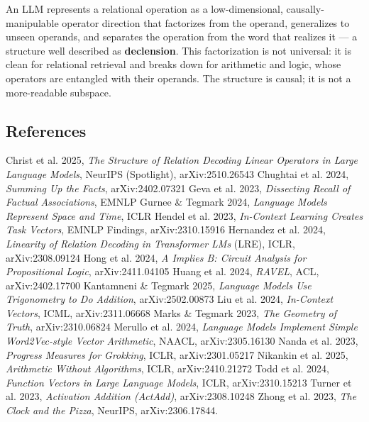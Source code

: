 An LLM represents a relational operation as a low-dimensional,
causally-manipulable operator direction that factorizes from the
operand, generalizes to unseen operands, and separates the operation
from the word that realizes it --- a structure well described as
\textbf{declension}. This factorization is not universal: it is clean
for relational retrieval and breaks down for arithmetic and logic, whose
operators are entangled with their operands. The structure is causal; it
is not a more-readable subspace.

\subsection{References}\label{references}

Christ et al. 2025, \emph{The Structure of Relation Decoding Linear Operators in Large Language Models}, NeurIPS (Spotlight), arXiv:2510.26543 \textperiodcentered{} Chughtai
et al. 2024, \emph{Summing Up the Facts}, arXiv:2402.07321 \textperiodcentered{} Geva et al.
2023, \emph{Dissecting Recall of Factual Associations}, EMNLP \textperiodcentered{} Gurnee
\& Tegmark 2024, \emph{Language Models Represent Space and Time}, ICLR \textperiodcentered{}
Hendel et al. 2023, \emph{In-Context Learning Creates Task Vectors},
EMNLP Findings, arXiv:2310.15916 \textperiodcentered{} Hernandez et al. 2024,
\emph{Linearity of Relation Decoding in Transformer LMs} (LRE), ICLR,
arXiv:2308.09124 \textperiodcentered{} Hong et al. 2024, \emph{A Implies B: Circuit Analysis
for Propositional Logic}, arXiv:2411.04105 \textperiodcentered{} Huang et al. 2024,
\emph{RAVEL}, ACL, arXiv:2402.17700 \textperiodcentered{} Kantamneni \& Tegmark 2025,
\emph{Language Models Use Trigonometry to Do Addition}, arXiv:2502.00873
\textperiodcentered{} Liu et al. 2024, \emph{In-Context Vectors}, ICML, arXiv:2311.06668 \textperiodcentered{}
Marks \& Tegmark 2023, \emph{The Geometry of Truth}, arXiv:2310.06824 \textperiodcentered{}
Merullo et al. 2024, \emph{Language Models Implement Simple
Word2Vec-style Vector Arithmetic}, NAACL, arXiv:2305.16130 \textperiodcentered{} Nanda et
al. 2023, \emph{Progress Measures for Grokking}, ICLR, arXiv:2301.05217
\textperiodcentered{} Nikankin et al. 2025, \emph{Arithmetic Without Algorithms}, ICLR,
arXiv:2410.21272 \textperiodcentered{} Todd et al. 2024, \emph{Function Vectors in Large
Language Models}, ICLR, arXiv:2310.15213 \textperiodcentered{} Turner et al. 2023,
\emph{Activation Addition (ActAdd)}, arXiv:2308.10248 \textperiodcentered{} Zhong et al.
2023, \emph{The Clock and the Pizza}, NeurIPS, arXiv:2306.17844.
